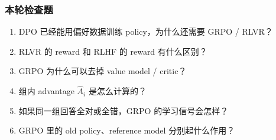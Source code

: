 \subsubsection{本轮检查题}

\begin{enumerate}[leftmargin=1.5em]
  \item DPO 已经能用偏好数据训练 policy，为什么还需要 GRPO / RLVR？
  \item RLVR 的 reward 和 RLHF 的 reward 有什么区别？
  \item GRPO 为什么可以去掉 value model / critic？
  \item 组内 advantage $\hat{A}_i$ 是怎么计算的？
  \item 如果同一组回答全对或全错，GRPO 的学习信号会怎样？
  \item GRPO 里的 old policy、reference model 分别起什么作用？
\end{enumerate}
